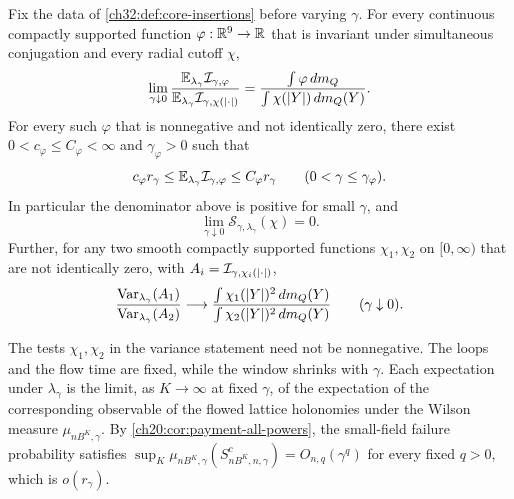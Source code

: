 \begin{theorem}\label{ch32:thm:core-ratios-and-ward}
Fix the data of \cref{ch32:def:core-insertions} before varying $\gamma$. For every continuous compactly supported function $\varphi:\mathbb R^9\to\mathbb R$ that is invariant under simultaneous conjugation and every radial cutoff $\chi$,
\[
 \lim_{\gamma\downarrow0}\frac{\mathbb E_{\lambda_\gamma}\mathcal I_{\gamma,\varphi}}{\mathbb E_{\lambda_\gamma}\mathcal I_{\gamma,\chi(\lvert \cdot\rvert)}}=\frac{\int\varphi\,dm_Q}{\int\chi(\lvert Y\rvert)\,dm_Q(Y)}.
\]
For every such $\varphi$ that is nonnegative and not identically zero, there exist $0<c_\varphi\le C_\varphi<\infty$ and $\gamma_\varphi>0$ such that
\[
 c_\varphi r_\gamma\le\mathbb E_{\lambda_\gamma}\mathcal I_{\gamma,\varphi}\le C_\varphi r_\gamma\qquad(0<\gamma\le\gamma_\varphi).
\]
In particular the denominator above is positive for small $\gamma$, and
\[
 \lim_{\gamma\downarrow0}\mathcal S_{\gamma,\lambda_\gamma}(\chi)=0.
\]
Further, for any two smooth compactly supported functions $\chi_1,\chi_2$ on $[0,\infty)$ that are not identically zero, with $A_i=\mathcal I_{\gamma,\chi_i(\lvert \cdot\rvert)}$,
\[
 \frac{\operatorname{Var}_{\lambda_\gamma}(A_1)}{\operatorname{Var}_{\lambda_\gamma}(A_2)}\longrightarrow\frac{\int\chi_1(\lvert Y\rvert)^2\,dm_Q(Y)}{\int\chi_2(\lvert Y\rvert)^2\,dm_Q(Y)}\qquad(\gamma\downarrow0).
\]
\end{theorem}

The tests $\chi_1,\chi_2$ in the variance statement need not be nonnegative. The loops and the flow time are fixed, while the window shrinks with $\gamma$. Each expectation under $\lambda_\gamma$ is the limit, as $K\to\infty$ at fixed $\gamma$, of the expectation of the corresponding observable of the flowed lattice holonomies under the Wilson measure $\mu_{nB^K,\gamma}$. By \cref{ch20:cor:payment-all-powers}, the small-field failure probability satisfies $\sup_K\mu_{nB^K,\gamma}(S_{nB^K,n,\gamma}^c)=O_{n,q}(\gamma^q)$ for every fixed $q>0$, which is $o(r_\gamma)$.


